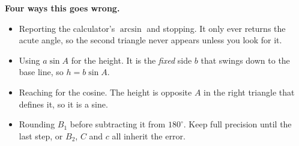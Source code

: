 \documentclass[12pt]{article}
\begin{document}
\begin{watchoutbox}
\textbf{Four ways this goes wrong.}
\begin{itemize}[leftmargin=0.9cm, itemsep=1pt, topsep=1pt]
\item Reporting the calculator's $\arcsin$ and stopping. It only ever returns
the acute angle, so the second triangle never appears unless you look for it.
\item Using $a\sin A$ for the height. It is the \emph{fixed} side $b$ that
swings down to the base line, so $h = b\sin A$.
\item Reaching for the cosine. The height is opposite $A$ in the right triangle
that defines it, so it is a sine.
\item Rounding $B_1$ before subtracting it from $180^\circ$. Keep full precision
until the last step, or $B_2$, $C$ and $c$ all inherit the error.
\end{itemize}
\end{watchoutbox}
\end{document}
